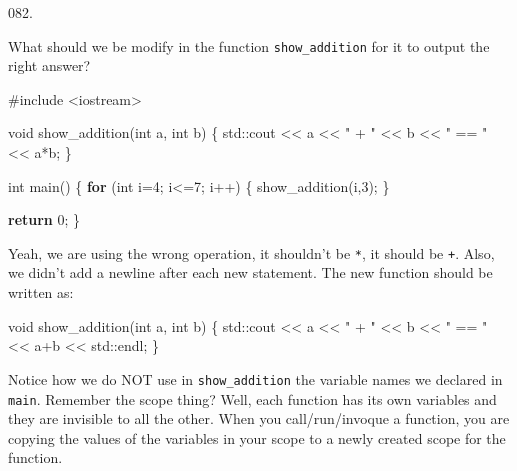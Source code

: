 \documentclass[]{book}
\newenvironment{Shaded}{}{}
\newcommand{\BuiltInTok}[1]{#1}
\newcommand{\ControlFlowTok}[1]{\textcolor[rgb]{0.00,0.44,0.13}{\textbf{#1}}}
\newcommand{\DataTypeTok}[1]{\textcolor[rgb]{0.56,0.13,0.00}{#1}}
\newcommand{\DecValTok}[1]{\textcolor[rgb]{0.25,0.63,0.44}{#1}}
\newcommand{\ImportTok}[1]{#1}
\newcommand{\NormalTok}[1]{#1}
\newcommand{\PreprocessorTok}[1]{\textcolor[rgb]{0.74,0.48,0.00}{#1}}
\newcommand{\StringTok}[1]{\textcolor[rgb]{0.25,0.44,0.63}{#1}}
\begin{document}
\begin{minipage}{\linewidth}\noindent
{\tiny 082.}\\
\begin{minipage}[t]{.485\linewidth}

What should we be modify in the function \texttt{show\_addition} for it
to output the right answer?

\begin{framed}

\begin{Shaded}
\begin{Highlighting}[]
\PreprocessorTok{#include }\ImportTok{<iostream>}

\DataTypeTok{void}\NormalTok{ show_addition(}\DataTypeTok{int}\NormalTok{ a, }\DataTypeTok{int}\NormalTok{ b) \{}
  \BuiltInTok{std::}\NormalTok{cout << a << }\StringTok{" + "}\NormalTok{ << b}
\NormalTok{            << }\StringTok{" == "}\NormalTok{ << a*b;}
\NormalTok{\}}

\DataTypeTok{int}\NormalTok{ main() \{}
  \ControlFlowTok{for}\NormalTok{ (}\DataTypeTok{int}\NormalTok{ i=}\DecValTok{4}\NormalTok{; i<=}\DecValTok{7}\NormalTok{; i++) \{}
\NormalTok{    show_addition(i,}\DecValTok{3}\NormalTok{);}
\NormalTok{  \}}

  \ControlFlowTok{return} \DecValTok{0}\NormalTok{;}
\NormalTok{\}}
\end{Highlighting}
\end{Shaded}

\end{framed}

\end{minipage}
\hfill
\begin{minipage}[t]{.485\linewidth}

Yeah, we are using the wrong operation, it shouldn't be \texttt{*}, it
should be \texttt{+}. Also, we didn't add a newline after each new
statement. The new function should be written as:

\begin{framed}

\begin{Shaded}
\begin{Highlighting}[]
\DataTypeTok{void}\NormalTok{ show_addition(}\DataTypeTok{int}\NormalTok{ a, }\DataTypeTok{int}\NormalTok{ b) \{}
  \BuiltInTok{std::}\NormalTok{cout << a << }\StringTok{" + "}\NormalTok{ << b}
\NormalTok{            << }\StringTok{" == "}\NormalTok{ << a+b}
\NormalTok{            << }\BuiltInTok{std::}\NormalTok{endl;}
\NormalTok{\}}
\end{Highlighting}
\end{Shaded}

\end{framed}

Notice how we do NOT use in \texttt{show\_addition} the variable names
we declared in \texttt{main}. Remember the scope thing? Well, each
function has its own variables and they are invisible to all the other.
When you call/run/invoque a function, you are copying the values of the
variables in your scope to a newly created scope for the function.

\end{minipage}
\end{minipage}
\end{document}
